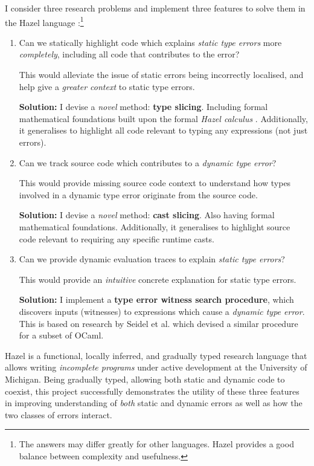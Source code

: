 I consider three research problems and implement three features to solve them in the Hazel language \cite{Hazel}:\footnote{The answers may differ greatly for other languages. Hazel provides a good balance between complexity and usefulness.}
\begin{enumerate}
\item Can we statically highlight code which explains \textit{static type errors} more \textit{completely}, including all code that contributes to the error? 

This would alleviate the issue of static errors being incorrectly localised, and help give a \textit{greater context} to static type errors.

\textbf{Solution:} I devise a \textit{novel} method: \textbf{type slicing}. Including formal mathematical foundations built upon the formal \textit{Hazel calculus} \cite{HazelLivePaper}. Additionally, it generalises to highlight all code relevant to typing any expressions (not just errors).

\item Can we track source code which contributes to a \textit{dynamic type error}?

This would provide missing source code context to understand how types involved in a dynamic type error originate from the source code.

\textbf{Solution:} I devise a \textit{novel} method: \textbf{cast slicing}. Also having formal mathematical foundations. Additionally, it generalises to highlight source code relevant to requiring any specific runtime casts.

\item Can we provide dynamic evaluation traces to explain \textit{static type errors}?

This would provide an \textit{intuitive} concrete explanation for static type errors.

\textbf{Solution:} I implement a \textbf{type error witness search procedure}, which discovers inputs (witnesses) to expressions which cause a \textit{dynamic type error}. This is based on research by Seidel et al. \cite{SearchProc} which devised a similar procedure for a subset of OCaml.
\end{enumerate}

Hazel \cite{Hazel} is a functional, locally inferred, and gradually typed research language that allows writing \textit{incomplete programs} under active development at the University of Michigan. Being gradually typed, allowing both static and dynamic code to coexist, this project successfully demonstrates the utility of these three features in improving understanding of \textit{both} static and dynamic errors as well as how the two classes of errors interact.

